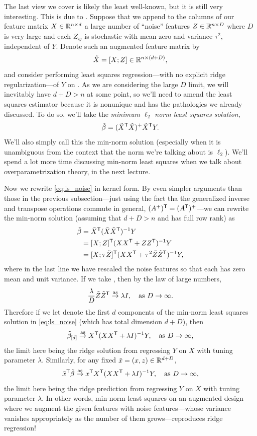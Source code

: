 \documentclass{article}
\begin{document}
The last view we cover is likely the least well-known, but it is still very 
interesting. This is due to \citet{kobak2020optimal}. Suppose that we append to
the columns of our feature matrix $X \in \mathbb{R}^{n \times d}$ a large number of
``noise'' features $Z \in \mathbb{R}^{n \times D}$ where $D$ is very large and each
$Z_{ij}$ is stochastic with mean zero and variance $\tau^2$, independent of
$Y$. Denote such an augmented feature matrix by
\[
\tilde X = [X; Z] \in \mathbb{R}^{n \times (d+D)},
\]
and consider performing least squares regression---with no explicit ridge
regularization---of $Y$ on . As we are considering the large
$D$ limit, we will inevitably have $d+D > n$ at some point, so we'll need to
amend the least squares estimator because it is nonunique and has the
pathologies we already discussed. To do so, we'll take the \emph{minimum 
  $\ell_2$ norm least squares solution}, 
\begin{equation}
\label{eq:ls_noise}
\tilde\beta = (\tilde X^{\mathsf{T}} \tilde X)^+ \tilde X^{\mathsf{T}} Y.
\end{equation}
We'll also simply call this the min-norm solution (especially when it is
unambiguous from the context that the norm we're talking about is
$\ell_2$). We'll spend a lot more time discussing min-norm least squares when we
talk about overparametrization theory, in the next lecture.  

Now we rewrite \eqref{eq:ls_noise} in kernel form. By even simpler arguments
than those in the previous subsection---just using the fact tha the generalized 
inverse and transpose operations commute in general, $(A^+)^{\mathsf{T}} = (A^{\mathsf{T}})^+$---we 
can rewrite the min-norm solution (assuming that $d+D > n$ and  has full row rank) as  
\begin{align*}
\tilde\beta &= \tilde X^{\mathsf{T}} (\tilde X \tilde X^{\mathsf{T}})^{-1} Y \\
&= [X; Z]^{\mathsf{T}} (XX^{\mathsf{T}} + ZZ^{\mathsf{T}})^{-1} Y \\
&= [X; \tau \tilde Z]^{\mathsf{T}} (XX^{\mathsf{T}} + \tau^2 \tilde Z \tilde Z^{\mathsf{T}})^{-1} Y,  
\end{align*}
where in the last line we have rescaled the noise features so that each
 has zero mean and unit variance. If 
we take , then by the law of large numbers, 
\[
\frac{\lambda}{D} \tilde Z \tilde Z^{\mathsf{T}} \overset{\mathrm{as}}{\to} \lambda I, \quad \text{as $D \to
  \infty$}. 
\]
Therefore if we let \smash{$\tilde \beta_{[d]}$} denote the first $d$ components
of the min-norm least squares solution in \eqref{eq:ls_noise} (which has total
dimension $d+D$), then   
\[
\tilde \beta_{[d]} \overset{\mathrm{as}}{\to} X^{\mathsf{T}} (XX^{\mathsf{T}} + \lambda I)^{-1} Y, \quad \text{as $D \to 
  \infty$},
\]
the limit here being the ridge solution from regressing $Y$ on $X$ with tuning
parameter $\lambda$. Similarly, for any fixed $\tilde x = (x, z) \in \mathbb{R}^{d+D}$,  
\[
\tilde x^{\mathsf{T}} \tilde \beta \overset{\mathrm{as}}{\to} x^{\mathsf{T}} X^{\mathsf{T}} (XX^{\mathsf{T}} + \lambda I)^{-1} Y, \quad
\text{as $D \to \infty$},
\]
the limit here being the ridge prediction from regressing $Y$ on $X$ with tuning
parameter $\lambda$. In other words, min-norm least squares on an augmented
design where we augment the given features with noise features---whose variance
vanishes appropriately as the number of them grows---reproduces ridge
regression! 
\end{document}
